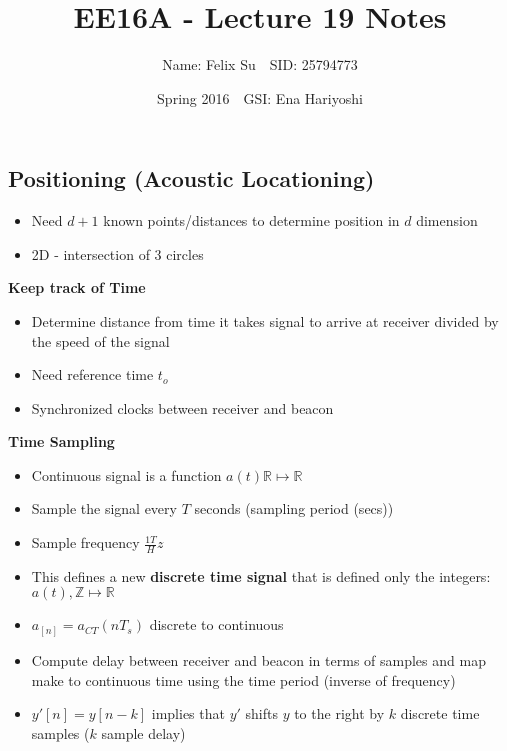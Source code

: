 \documentclass{article}\usepackage{amsmath,amssymb,amsthm,tikz,tkz-graph,color,chngpage,soul,hyperref,csquotes,graphicx,floatrow}\newcommand*{\QEDB}{\hfill\ensuremath{\square}}\newtheorem*{prop}{Proposition}\renewcommand{\theenumi}{\alph{enumi}}\usepackage[shortlabels]{enumitem}\usepackage[nobreak=true]{mdframed}\usetikzlibrary{matrix,calc}\MakeOuterQuote{"}\usepackage[margin=0.75in]{geometry} \newtheorem{theorem}{Theorem}\newcommand{\Z}{\mathbb Z}\newcommand{\R}{\mathbb R}\newcommand{\Q}{\mathbb Q}\newcommand{\N}{\mathbb N}\newcommand{\x}[1]{\textrm{ #1 }}\newcommand{\pr}{\textrm{Pr}}
\title{EE16A - Lecture 19 Notes}
\author{Name: Felix Su$\quad$SID: 25794773}
\date{Spring 2016$\quad$GSI: Ena Hariyoshi}
\begin{document}
\maketitle

\subsection*{Positioning (Acoustic Locationing)}
\begin{itemize}
    \item Need $d+1$ known points/distances to determine position in $d$ dimension
    \item 2D - intersection of 3 circles
\end{itemize}
\textbf{Keep track of Time}
\begin{itemize}
    \item Determine distance from time it takes signal to arrive at receiver divided by the speed of the signal
    \item Need reference time $t_o$
    \item Synchronized clocks between receiver and beacon
\end{itemize}
\textbf{Time Sampling}
\begin{itemize}
    \item Continuous signal is a function $a(t) \R \mapsto \R$
    \item Sample the signal every $T$ seconds (sampling period (secs))
    \item Sample frequency $\frac{ 1T} Hz$
    \item This defines a new \textbf{discrete time signal} that is defined only the integers: $a(t), \Z \mapsto \R$
    \item $a_[n]=a_{CT}(nT_s)$ discrete to continuous
    \item Compute delay between receiver and beacon in terms of samples and map make to continuous time using the time period (inverse of frequency)
    \item $y'[n]=y[n-k]$ implies that $y'$ shifts $y$ to the right by $k$ discrete time samples ($k$ sample delay)
\end{itemize}
\end{document}
